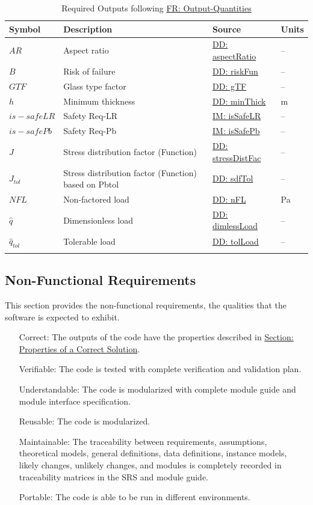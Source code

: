 \documentclass[12pt]{article}
\begin{document}
\begin{longtabu}{l X[l] l l}
\toprule
Symbol & Description & Source & Units
\\
\midrule
\endhead
$AR$ & Aspect ratio & \hyperref[DD:aspectRatio]{DD: aspectRatio} & --
\\
$B$ & Risk of failure & \hyperref[DD:riskFun]{DD: riskFun} & --
\\
$GTF$ & Glass type factor & \hyperref[DD:gTF]{DD: gTF} & --
\\
$h$ & Minimum thickness & \hyperref[DD:minThick]{DD: minThick} & m
\\
$is-safeLR$ & Safety Req-LR & \hyperref[IM:isSafeLR]{IM: isSafeLR} & --
\\
$is-safePb$ & Safety Req-Pb & \hyperref[IM:isSafePb]{IM: isSafePb} & --
\\
$J$ & Stress distribution factor (Function) & \hyperref[DD:stressDistFac]{DD: stressDistFac} & --
\\
${J_{tol}}$ & Stress distribution factor (Function) based on Pbtol & \hyperref[DD:sdfTol]{DD: sdfTol} & --
\\
$NFL$ & Non-factored load & \hyperref[DD:nFL]{DD: nFL} & Pa
\\
$\hat{q}$ & Dimensionless load & \hyperref[DD:dimlessLoad]{DD: dimlessLoad} & --
\\
${\hat{q}_{tol}}$ & Tolerable load & \hyperref[DD:tolLoad]{DD: tolLoad} & --
\\
\bottomrule
\caption{Required Outputs following \hyperref[outputQuants]{FR: Output-Quantities}}
\label{Table:ReqOutputs}
\end{longtabu}
\subsection{Non-Functional Requirements}
\label{Sec:NFRs}
This section provides the non-functional requirements, the qualities that the software is expected to exhibit.
\begin{itemize}
\item[Correct:\phantomsection\label{correct}]The outputs of the code have the properties described in \hyperref[Sec:CorSolProps]{Section: Properties of a Correct Solution}.
\item[Verifiable:\phantomsection\label{verifiable}]The code is tested with complete verification and validation plan.
\item[Understandable:\phantomsection\label{understandable}]The code is modularized with complete module guide and module interface specification.
\item[Reusable:\phantomsection\label{reusable}]The code is modularized.
\item[Maintainable:\phantomsection\label{maintainable}]The traceability between requirements, assumptions, theoretical models, general definitions, data definitions, instance models, likely changes, unlikely changes, and modules is completely recorded in traceability matrices in the SRS and module guide.
\item[Portable:\phantomsection\label{portable}]The code is able to be run in different environments.
\end{itemize}
\end{document}
